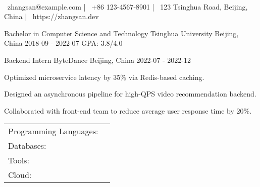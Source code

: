 \documentclass[]{awesome-cv}
\begin{document}
\begin{center}
	 \\
	\vspace{2mm}
     {\faEnvelope\ zhangsan@example.com} |      {\faMobile\ +86 123{-}4567{-}8901} |      {\faMapMarker\ 123 Tsinghua Road, Beijing, China} |      {\faLink\ https://zhangsan.dev} \
\end{center}


\begin{cventries}
	    \cventry
	{Bachelor  in Computer Science and Technology  }
	{ Tsinghua University }
	{ Beijing, China  }
	{ 2018{-}09 -   2022{-}07 }
	{ GPA: 3.8/4.0 }
    \end{cventries}

\vspace{-2mm}


\begin{cventries}
	\cventry
	{ Backend Intern  }
	{ ByteDance  }
	{ Beijing, China }
	{ 2022{-}07 -   2022{-}12 }
	{ \begin{cvitems} 		\item Optimized microservice latency by 35\% via Redis{-}based caching.
				\item Designed an asynchronous pipeline for high{-}QPS video recommendation backend.
				\item Collaborated with front{-}end team to reduce average user response time by 20\%.
		 \end{cvitems} }
\end{cventries}


\begin{cventries}
	\cventry
	{}
	{\def\arraystretch{1.15}{\begin{tabular}{ l l }
		        Programming Languages:  & {\skill{ Python, Go, C++}}\\
                Databases:  & {\skill{ PostgreSQL, MongoDB, Redis}}\\
                Tools:  & {\skill{ Docker, Git, Linux}}\\
                Cloud:  & {\skill{ GCP, Kubernetes, Terraform}}\\
        		\end{tabular}}}
	{}
	{}
	{}
\end{cventries}
\end{document}
